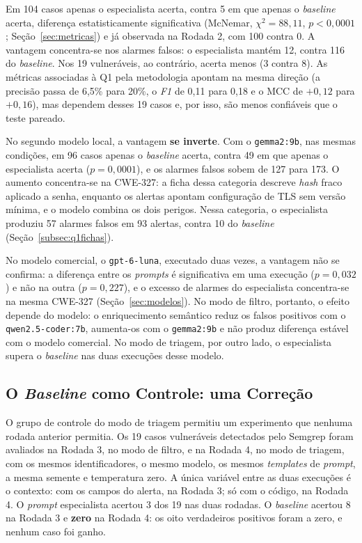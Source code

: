 Em 104 casos apenas o especialista acerta, contra 5 em que apenas o \textit{baseline} acerta, diferença estatisticamente significativa (McNemar, $\chi^2 = 88{,}11$, $p < 0{,}0001$; Seção~\ref{sec:metricas}) e já observada na Rodada 2, com 100 contra 0. A vantagem concentra-se nos alarmes falsos: o especialista mantém 12, contra 116 do \textit{baseline}. Nos 19 vulneráveis, ao contrário, acerta menos (3 contra 8). As métricas associadas à Q1 pela metodologia apontam na mesma direção (a precisão passa de 6,5\% para 20\%, o \textit{F1} de 0,11 para 0,18 e o MCC de $+0{,}12$ para $+0{,}16$), mas dependem desses 19 casos e, por isso, são menos confiáveis que o teste pareado.

No segundo modelo local, a vantagem \textbf{se inverte}. Com o \texttt{gemma2:9b}, nas mesmas condições, em 96 casos apenas o \textit{baseline} acerta, contra 49 em que apenas o especialista acerta ($p = 0{,}0001$), e os alarmes falsos sobem de 127 para 173. O aumento concentra-se na CWE-327: a ficha dessa categoria descreve \textit{hash} fraco aplicado a senha, enquanto os alertas apontam configuração de TLS sem versão mínima, e o modelo combina os dois perigos. Nessa categoria, o especialista produziu 57 alarmes falsos em 93 alertas, contra 10 do \textit{baseline} (Seção~\ref{subsec:q1fichas}).

No modelo comercial, o \texttt{gpt-6-luna}, executado duas vezes, a vantagem não se confirma: a diferença entre os \textit{prompts} é significativa em uma execução ($p = 0{,}032$) e não na outra ($p = 0{,}227$), e o excesso de alarmes do especialista concentra-se na mesma CWE-327 (Seção~\ref{sec:modelos}). No modo de filtro, portanto, o efeito depende do modelo: o enriquecimento semântico reduz os falsos positivos com o \texttt{qwen2.5-coder:7b}, aumenta-os com o \texttt{gemma2:9b} e não produz diferença estável com o modelo comercial. No modo de triagem, por outro lado, o especialista supera o \textit{baseline} nas duas execuções desse modelo.

\subsection{O \textit{Baseline} como Controle: uma Correção}
\label{subsec:q1controle}

O grupo de controle do modo de triagem permitiu um experimento que nenhuma rodada anterior permitia. Os 19 casos vulneráveis detectados pelo Semgrep foram avaliados na Rodada 3, no modo de filtro, e na Rodada 4, no modo de triagem, com os mesmos identificadores, o mesmo modelo, os mesmos \textit{templates} de \textit{prompt}, a mesma semente e temperatura zero. A única variável entre as duas execuções é o contexto: com os campos do alerta, na Rodada 3; só com o código, na Rodada 4. O \textit{prompt} especialista acertou 3 dos 19 nas duas rodadas. O \textit{baseline} acertou 8 na Rodada 3 e \textbf{zero} na Rodada 4: os oito verdadeiros positivos foram a zero, e nenhum caso foi ganho.

